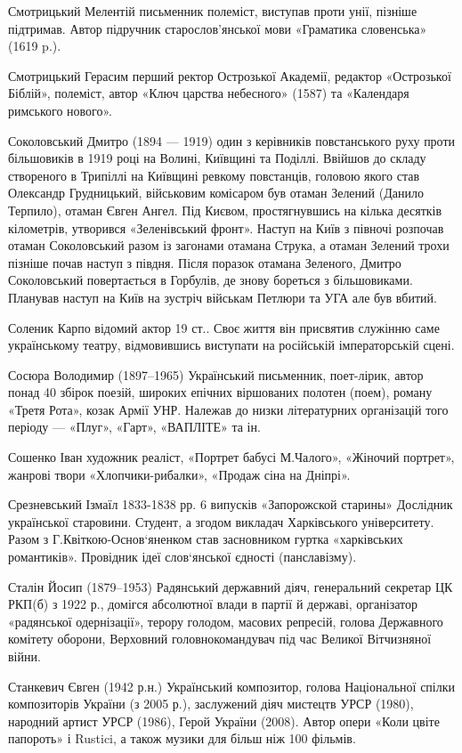 Смотрицький  Мелентій письменник полеміст, виступав проти унії, пізніше підтримав. Автор підручник старослов'янської мови «Граматика словенська» (1619 p.).

Смотрицький Герасим  перший ректор Острозької Академії, редактор «Острозької Біблій», полеміст, автор «Ключ царства небесного» (1587) та «Календаря римського нового».

Соколовський Дмитро  (1894 — 1919) один з керівників повстанського руху проти більшовиків в 1919 році на Волині, Київщині та Поділлі. Ввійшов до складу створеного в Трипіллі на Київщині ревкому повстанців, головою якого став Олександр Грудницький, військовим комісаром був отаман Зелений (Данило Терпило), отаман Євген Ангел.  Під Києвом, простягнувшись на кілька десятків кілометрів, утворився «Зеленівський фронт». Наступ на Київ з півночі розпочав отаман Соколовський разом із загонами отамана Струка, а отаман Зелений трохи пізніше почав наступ з півдня. Після поразок отамана Зеленого, Дмитро Соколовський повертається в Горбулів, де знову бореться з більшовиками. Планував наступ на Київ на зустріч військам Петлюри та УГА  але був вбитий.

Соленик Карпо відомий актор 19 ст.. Своє життя він присвятив служінню саме українському театру, відмовившись виступати на російській імператорській сцені.  

Сосюра Володимир (1897–1965) Український письменник, поет-лірик, автор понад 40 збірок поезій, широких епічних віршованих полотен (поем), роману «Третя Рота», козак Армії УНР. Належав до низки літературних організацій того періоду — «Плуг», «Гарт», «ВАПЛІТЕ» та ін.

Сошенко Іван художник реаліст, «Портрет бабусі М.Чалого», «Жіночий портрет», жанрові твори «Хлопчики-рибалки», «Продаж сіна на Дніпрі».

Срезневський Ізмаїл 1833-1838 рр. 6 випусків «Запорожской старины» Дослідник української старовини. Студент, а згодом викладач Харківського університету. Разом з Г.Квіткою-Основ‘яненком став засновником гуртка «харківських романтиків». Провідник ідеї слов‘янської єдності (панславізму).

Сталін Йосип (1879–1953) Радянський державний діяч, генеральний секретар ЦК РКП(б) з 1922 р., домігся абсолютної влади в партії й державі, організатор «радянської одернізації», терору голодом, масових репресій, голова Державного комітету оборони, Верховний головнокомандувач під час Великої Вітчизняної війни.

Станкевич Євген (1942 р.н.) Український композитор, голова Національної спілки композиторів України (з 2005 р.), заслужений діяч мистецтв УРСР (1980), народний артист УРСР (1986), Герой України (2008). Автор опери «Коли цвіте папороть» і Rustici, а також музики для більш ніж 100 фільмів.

